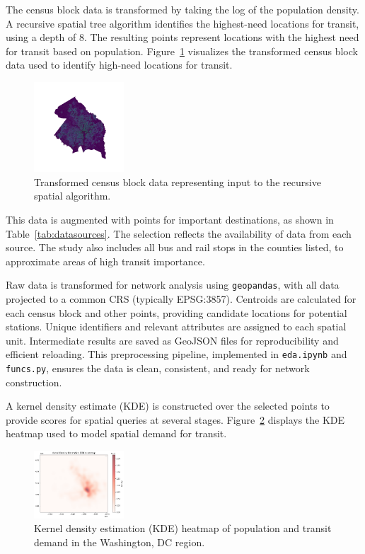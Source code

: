 \documentclass[sigconf,nonacm]{acmart}
\begin{document}
The census block data is transformed by taking the log of the population density. A recursive spatial tree algorithm identifies the highest-need locations for transit, using a depth of 8. The resulting points represent locations with the highest need for transit based on population. Figure~\ref{fig:point_likelihood} visualizes the transformed census block data used to identify high-need locations for transit.

\begin{figure}[h]
    \centering
    \includegraphics[width=0.3\textwidth]{./img/point_likelihood.png}
    \caption{Transformed census block data representing input to the recursive spatial algorithm.}
    \label{fig:point_likelihood}
\end{figure}

This data is augmented with points for important destinations, as shown in Table~\ref{tab:datasources}. The selection reflects the availability of data from each source. The study also includes all bus and rail stops in the counties listed, to approximate areas of high transit importance.

Raw data is transformed for network analysis using \texttt{geopandas}, with all data projected to a common CRS (typically EPSG:3857). Centroids are calculated for each census block and other points, providing candidate locations for potential stations. Unique identifiers and relevant attributes are assigned to each spatial unit. Intermediate results are saved as GeoJSON files for reproducibility and efficient reloading. This preprocessing pipeline, implemented in \texttt{eda.ipynb} and \texttt{funcs.py}, ensures the data is clean, consistent, and ready for network construction.

A kernel density estimate (KDE) is constructed over the selected points to provide scores for spatial queries at several stages. Figure~\ref{fig:kde_heatmap} displays the KDE heatmap used to model spatial demand for transit.

\begin{figure}[h]
    \centering
    \includegraphics[width=0.3\textwidth]{./img/kde.png}
    \caption{Kernel density estimation (KDE) heatmap of population and transit demand in the Washington, DC region.}
    \label{fig:kde_heatmap}
\end{figure}
\end{document}
